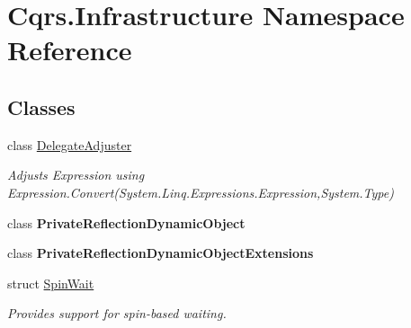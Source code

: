 \hypertarget{namespaceCqrs_1_1Infrastructure}{}\section{Cqrs.\+Infrastructure Namespace Reference}
\label{namespaceCqrs_1_1Infrastructure}
\subsection*{Classes}
\begin{DoxyCompactItemize}
\item 
class \hyperlink{classCqrs_1_1Infrastructure_1_1DelegateAdjuster}{Delegate\+Adjuster}
\begin{DoxyCompactList}\small\item\em Adjusts Expression using Expression.\+Convert(\+System.\+Linq.\+Expressions.\+Expression,\+System.\+Type) \end{DoxyCompactList}\item 
class {\bfseries Private\+Reflection\+Dynamic\+Object}
\item 
class {\bfseries Private\+Reflection\+Dynamic\+Object\+Extensions}
\item 
struct \hyperlink{structCqrs_1_1Infrastructure_1_1SpinWait}{Spin\+Wait}
\begin{DoxyCompactList}\small\item\em Provides support for spin-\/based waiting. \end{DoxyCompactList}\end{DoxyCompactItemize}
